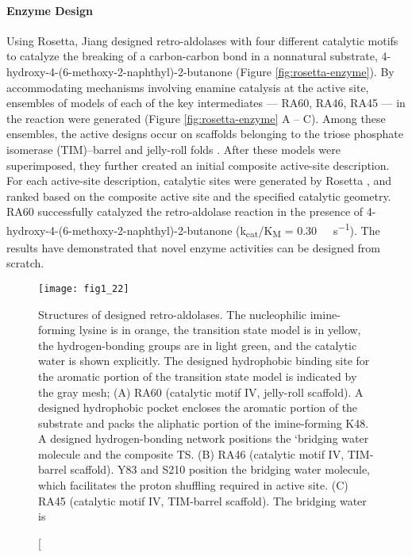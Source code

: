 \begin{refsection}
\paragraph{Enzyme Design}

Using Rosetta, Jiang  designed retro-aldolases with four
different catalytic motifs to catalyze the breaking of a carbon-carbon bond in
a nonnatural substrate, 4-hydroxy-4-(6-methoxy-2-naphthyl)-2-butanone
\cite{Jiang2008} (Figure \ref{fig:rosetta-enzyme}). By accommodating mechanisms
involving enamine catalysis at the active site, ensembles of models of each of
the key intermediates --- RA60, RA46, RA45 --- in the reaction were generated
(Figure \ref{fig:rosetta-enzyme} A -- C). Among these ensembles, the active
designs occur on scaffolds belonging to the triose phosphate isomerase
(TIM)–barrel and jelly-roll folds \cite{Jiang2008}. After these models were
superimposed, they further created an initial composite active-site
description. For each active-site description, catalytic sites were generated
by Rosetta \cite{Jiang2008}, and ranked based on the composite active site and
the specified catalytic geometry. RA60 successfully catalyzed the
retro-aldolase reaction in the presence of
4-hydroxy-4-(6-methoxy-2-naphthyl)-2-butanone
(k\textsubscript{cat}/K\textsubscript{M} = \SI{0.30}{\per\Molar\per\second}).
The results have demonstrated that novel enzyme activities can be designed from
scratch.
\begin{figure}[htbp] \centering \texttt{[image: fig1\_22]}
    \caption[Structures of designed retro-aldolases. The nucleophilic
        imine-forming lysine is in orange, the transition state model is in
        yellow, the hydrogen-bonding groups are in light green, and the
        catalytic water is shown explicitly.  The designed hydrophobic binding
        site for the aromatic portion of the transition state model is
        indicated by the gray mesh; (A) RA60 (catalytic motif IV, jelly-roll
        scaffold). A designed hydrophobic pocket encloses the aromatic portion
        of the substrate and packs the aliphatic portion of the imine-forming
        K48. A designed hydrogen-bonding network positions the `bridging water
        molecule and the composite TS. (B) RA46 (catalytic motif IV, TIM-barrel
        scaffold). Y83 and S210 position the bridging water molecule, which
        facilitates the proton shuffling required in active site. (C) RA45
        (catalytic motif IV, TIM-barrel scaffold). The bridging water is

\end{figure}
\end{refsection}
